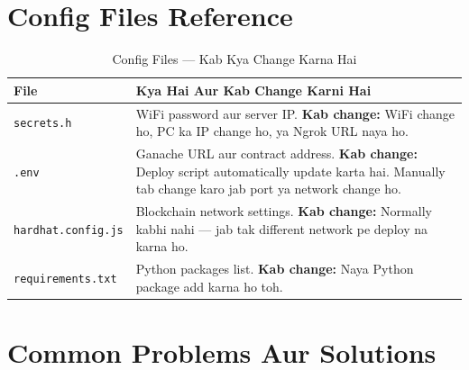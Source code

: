 \section{Config Files Reference}

\begin{table}[H]
\centering
\begin{tabularx}{\textwidth}{l X}
\toprule
\textbf{File} & \textbf{Kya Hai Aur Kab Change Karni Hai} \\
\midrule
\texttt{secrets.h} & WiFi password aur server IP. \textbf{Kab change:} WiFi change ho, PC ka IP change ho, ya Ngrok URL naya ho. \\
\texttt{.env} & Ganache URL aur contract address. \textbf{Kab change:} Deploy script automatically update karta hai. Manually tab change karo jab port ya network change ho. \\
\texttt{hardhat.config.js} & Blockchain network settings. \textbf{Kab change:} Normally kabhi nahi --- jab tak different network pe deploy na karna ho. \\
\texttt{requirements.txt} & Python packages list. \textbf{Kab change:} Naya Python package add karna ho toh. \\
\bottomrule
\end{tabularx}
\caption{Config Files --- Kab Kya Change Karna Hai}
\end{table}

\section{Common Problems Aur Solutions}


